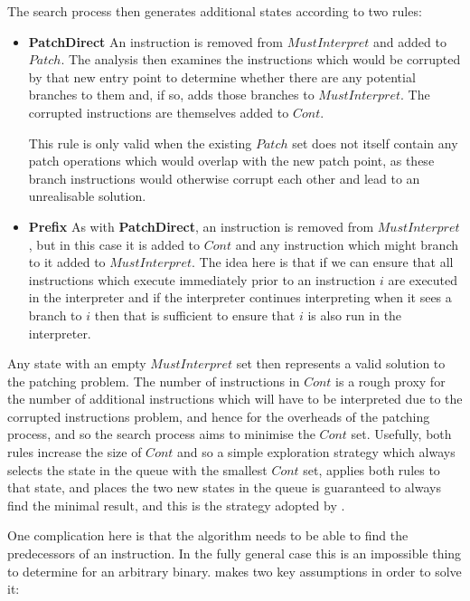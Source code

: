 The search process then generates additional states according to two
rules:

\begin{itemize}
\item
  \textbf{PatchDirect} An instruction is removed from
  $\mathit{MustInterpret}$ and added to $\mathit{Patch}$.  The
  analysis then examines the instructions which would be corrupted by
  that new entry point to determine whether there are any potential
  branches to them and, if so, adds those branches to
  $\mathit{MustInterpret}$.  The corrupted instructions are themselves
  added to $\mathit{Cont}$.

  This rule is only valid when the existing $\mathit{Patch}$ set does
  not itself contain any patch operations which would overlap with the
  new patch point, as these branch instructions would otherwise
  corrupt each other and lead to an unrealisable solution.
\item
  \textbf{Prefix} As with \textbf{PatchDirect}, an instruction is
  removed from $\mathit{MustInterpret}$, but in this case it is added
  to $\mathit{Cont}$ and any instruction which might branch to it
  added to $\mathit{MustInterpret}$.  The idea here is that if we can
  ensure that all instructions which execute immediately prior to an
  instruction $i$ are executed in the interpreter and if the
  interpreter continues interpreting when it sees a branch to $i$ then
  that is sufficient to ensure that $i$ is also run in the
  interpreter.
\end{itemize}

Any state with an empty $\mathit{MustInterpret}$ set then represents a
valid solution to the patching problem.  The number of instructions in
$\mathit{Cont}$ is a rough proxy for the number of additional
instructions which will have to be interpreted due to the corrupted
instructions problem, and hence for the overheads of the patching
process, and so the search process aims to minimise the
$\mathit{Cont}$ set.  Usefully, both rules increase the size of
$\mathit{Cont}$ and so a simple exploration strategy which always
selects the state in the queue with the smallest $\mathit{Cont}$ set,
applies both rules to that state, and places the two new states in the
queue is guaranteed to always find the minimal result, and this is the
strategy adopted by {\implementation}.

One complication here is that the algorithm needs to be able to find
the predecessors of an instruction.  In the fully general case this is
an impossible thing to determine for an arbitrary binary.
{\Technique} makes two key assumptions in order to solve it:

